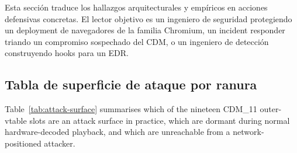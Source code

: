\documentclass[11pt,letterpaper]{article}
\begin{document}
Esta sección traduce los hallazgos arquitecturales y empíricos
en acciones defensivas concretas. El lector objetivo es un ingeniero
de seguridad protegiendo un deployment de navegadores de la familia
Chromium, un incident responder triando un compromiso sospechado
del CDM, o un ingeniero de detección construyendo hooks para un EDR.

\subsection{Tabla de superficie de ataque por ranura}

Table~\ref{tab:attack-surface} summarises which of the nineteen
CDM\_11 outer-vtable slots are an attack surface in practice,
which are dormant during normal hardware-decoded playback, and
which are unreachable from a network-positioned attacker.
\end{document}
